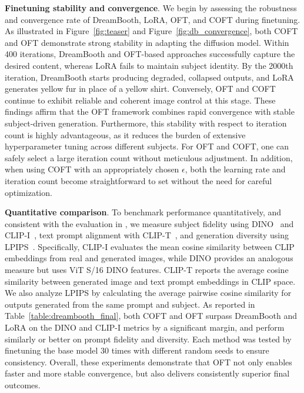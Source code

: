\textbf{Finetuning stability and convergence}. We begin by assessing the robustness and convergence rate of DreamBooth, LoRA, OFT, and COFT during finetuning. As illustrated in Figure~\ref{fig:teaser} and Figure~\ref{fig:db_convergence}, both COFT and OFT demonstrate strong stability in adapting the diffusion model. Within 400 iterations, DreamBooth and OFT-based approaches successfully capture the desired content, whereas LoRA fails to maintain subject identity. By the 2000th iteration, DreamBooth starts producing degraded, collapsed outputs, and LoRA generates yellow fur in place of a yellow shirt. Conversely, OFT and COFT continue to exhibit reliable and coherent image control at this stage. These findings affirm that the OFT framework combines rapid convergence with stable subject-driven generation. Furthermore, this stability with respect to iteration count is highly advantageous, as it reduces the burden of extensive hyperparameter tuning across different subjects. For OFT and COFT, one can safely select a large iteration count without meticulous adjustment. In addition, when using COFT with an appropriately chosen $\epsilon$, both the learning rate and iteration count become straightforward to set without the need for careful optimization.

\textbf{Quantitative comparison}. To benchmark performance quantitatively, and consistent with the evaluation in \cite{ruiz2023dreambooth}, we measure subject fidelity using DINO~\cite{caron2021emerging} and CLIP-I~\cite{radford2021learning}, text prompt alignment with CLIP-T~\cite{radford2021learning}, and generation diversity using LPIPS~\cite{zhang2018unreasonable}. Specifically, CLIP-I evaluates the mean cosine similarity between CLIP embeddings from real and generated images, while DINO provides an analogous measure but uses ViT S/16 DINO features. CLIP-T reports the average cosine similarity between generated image and text prompt embeddings in CLIP space. We also analyze LPIPS by calculating the average pairwise cosine similarity for outputs generated from the same prompt and subject. As reported in Table~\ref{table:dreambooth_final}, both COFT and OFT surpass DreamBooth and LoRA on the DINO and CLIP-I metrics by a significant margin, and perform similarly or better on prompt fidelity and diversity. Each method was tested by finetuning the base model 30 times with different random seeds to ensure consistency. Overall, these experiments demonstrate that OFT not only enables faster and more stable convergence, but also delivers consistently superior final outcomes.

